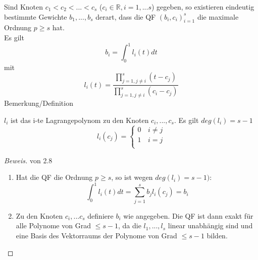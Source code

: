 \begin{theorem}
Sind Knoten $c_1 < c_2 < ... < c_s$ ($c_i \in \mathbb{R}, i = 1,...s$) gegeben, so existieren eindeutig bestimmte Gewichte $b_1 ,..., b_s$ derart, dass die QF $(b_i, c_i)_{i=1}^s$ die maximale Ordnung $p \geq s$ hat. \\
Es gilt $$b_i = \int_0^1 l_i(t) dt$$ mit $$l_i(t) = \frac{\prod_{j=1, j\neq i}^s (t-c_j)}{\prod_{j=1, j\neq i}^s (c_i-c_j)}$$
Bemerkung/Definition
\begin{description}
  \item $l_i$ ist das i-te Lagrangepolynom zu den Knoten $c_i, ...,c_s$. Es gilt $deg(l_i) = s-1$ 
  $$l_i(c_j) = \left\{
\begin{array}{ll}
0 & \,i \neq j \\
1 & \, i = j\\
\end{array}
\right. $$
\end{description}

\begin{proof}[Beweis] von 2.8 \\
\begin{enumerate}
  \item Hat die QF die Ordnung $p \geq s$, so ist wegen $deg(l_i) = s-1)$:
  $$ \int_0^1 l_i(t) dt = \sum_{j=1}^s b_j l_i(c_j) = b_i$$
  \item Zu den Knoten $c_i, ...c_s$ definiere $b_i$ wie angegeben. Die QF ist dann exakt für alle Polynome von Grad $ \leq s-1$, da die $l_1, ...,l_s$ linear unabhängig sind und eine Basis des Vektorraums der Polynome von Grad $\leq s-1$ bilden.
\end{enumerate}
\end{proof}
\end{theorem}
